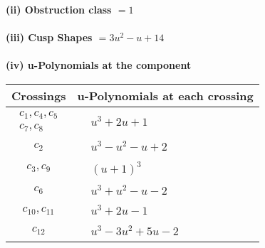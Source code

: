 \documentclass[1p]{elsarticle_modified}
\theoremstyle{definition}
\begin{document}
\flushleft \textbf{(ii) Obstruction class $= 1$}\\~\\
\flushleft \textbf{(iii) Cusp Shapes $= 3 u^2- u+14$}\\~\\
\newpage\renewcommand{\arraystretch}{1}
\flushleft \textbf{(iv) u-Polynomials at the component}\newline \\
\begin{tabular}{m{50pt}|m{274pt}}
Crossings & \hspace{64pt}u-Polynomials at each crossing \\
\hline $$\begin{aligned}c_{1},c_{4},c_{5}\\c_{7},c_{8}\end{aligned}$$&$\begin{aligned}
&u^3+2 u+1
\end{aligned}$\\
\hline $$\begin{aligned}c_{2}\end{aligned}$$&$\begin{aligned}
&u^3- u^2- u+2
\end{aligned}$\\
\hline $$\begin{aligned}c_{3},c_{9}\end{aligned}$$&$\begin{aligned}
&(u+1)^3
\end{aligned}$\\
\hline $$\begin{aligned}c_{6}\end{aligned}$$&$\begin{aligned}
&u^3+u^2- u-2
\end{aligned}$\\
\hline $$\begin{aligned}c_{10},c_{11}\end{aligned}$$&$\begin{aligned}
&u^3+2 u-1
\end{aligned}$\\
\hline $$\begin{aligned}c_{12}\end{aligned}$$&$\begin{aligned}
&u^3-3 u^2+5 u-2
\end{aligned}$\\
\hline
\end{tabular}\\~\\
\end{document}
